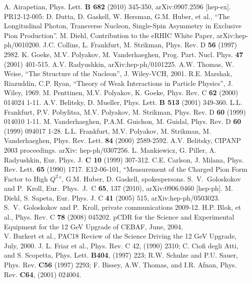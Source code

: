 \documentclass[preprint,superscriptaddress]{revtex4}
\begin{document}
\begin{thebibliography}{}

 A. Airapetian, Phys. Lett. {\bf B 682} (2010) 345-350,
  arXiv:0907.2596 [hep-ex].
 PR12-12-005:
D. Dutta, D. Gaskell, W. Hersman, G.M. Huber, et al., ``The Longitudinal
Photon, Transverse Nucleon, Single-Spin Asymmetry in Exclusive Pion
Production''.
 M. Diehl, Contribution to the eRHIC White Paper,
arXiv:hep-ph/0010200.
 J.C. Collins, L. Frankfurt, M. Strikman, Phys. Rev. D {\bf 56}
  (1997) 2982.
 K. Goeke, M.V. Polyakov, M. Vanderhaeghen,
  Prog. Part. Nucl. Phys. {\bf 47} (2001) 401-515.
 A.V. Radyushkin, arXiv:hep-ph/0101225.
 A.W. Thomas, W. Weise, ``The Structure of the Nucleon'',
  J. Wiley-VCH, 2001.
 R.E. Marshak, Riazuddin, C.P. Ryan, ``Theory of Weak
  Interactions in Particle Physics'', J. Wiley, 1969.
 M. Penttinen, M.V. Polyakov, K. Goeke, Phys. Rev. C {\bf 62}
  (2000) 014024 1-11.
 A.V. Belitsky, D. Mueller, Phys. Lett. {\bf B 513}
  (2001) 349-360.
 L.L. Frankfurt, P.V. Pobylitsa, M.V. Polyakov, M. Strikman,
  Phys. Rev. D {\bf 60} (1999) 014010 1-11.
 M. Vanderhaeghen, P.A.M. Guichon, M. Guidal, Phys. Rev. D 
  {\bf 60} (1999) 094017 1-28.
 L.L. Frankfurt, M.V. Polyakov, M. Strikman, M. Vanderhaeghen,
  Phys. Rev. Lett. {\bf 84} (2000) 2589-2592.
 A.V. Belitsky, CIPANP 2003 proceedings.  arXiv:
  hep-ph/0307256.
 L. Mankiewicz, G. Piller, A. Radyushkin, Eur. Phys. J. {\bf C
    10} (1999) 307-312.
 C.E. Carlson, J. Milana, Phys. Rev. Lett. {\bf 65} (1990) 1717.
 E12-06-101, ``Measurement of the Charged Pion Form Factor to
  High $Q^2$'', G.M. Huber, D. Gaskell, spokespersons.
 S.~V.~Goloskokov and P.~Kroll, Eur.\ Phys.\ J.\ C {\bf 65},
  137 (2010), arXiv:0906.0460 [hep-ph].
 M. Diehl, S. Sapeta, Eur. Phys. J. C {\bf 41} (2005) 515,
  arXiv:hep-ph/0503023.
 S.~V.~Goloskokov and P.~Kroll, private communications 2009-12.
 H.P. Blok, et al., Phys. Rev. C {\bf 78} (2008) 045202.
 pCDR for the Science and Experimental Equipment for the 12 GeV
  Upgrade of CEBAF, June, 2004.\\
V. Burkert et al., PAC18 Review of the Science Driving the 12 GeV Upgrade, 
  July, 2000.
J. L. Friar et al., Phys. Rev. C 42, (1990) 2310; C. Ciofi
degli Atti, and S. Scopetta, Phys. Lett. {\bf B404}, (1997) 223; R.W. Schulze
and P.U. Sauer, Phys. Rev. {\bf C56} (1997) 2293; F. Bissey, A.W. Thomas, and
I.R. Afnan, Phys. Rev. {\bf C64}, (2001) 024004.
\end{thebibliography}
\end{document}
